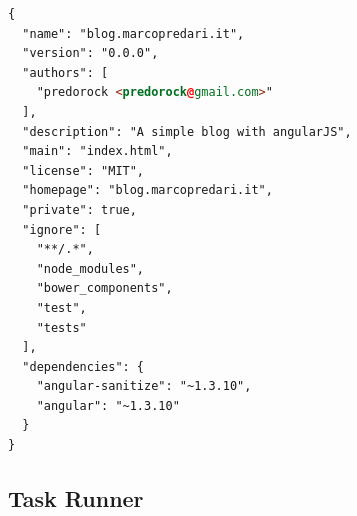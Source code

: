 \begin{lstlisting}[language=html,caption={Una tipica configurazione del file bower.json},
				   label={lst:bowerjson}]
{
  "name": "blog.marcopredari.it",
  "version": "0.0.0",
  "authors": [
    "predorock <predorock@gmail.com>"
  ],
  "description": "A simple blog with angularJS",
  "main": "index.html",
  "license": "MIT",
  "homepage": "blog.marcopredari.it",
  "private": true,
  "ignore": [
    "**/.*",
    "node_modules",
    "bower_components",
    "test",
    "tests"
  ],
  "dependencies": {
    "angular-sanitize": "~1.3.10",
    "angular": "~1.3.10"
  }
}

\end{lstlisting}

\subsection{Task Runner}

